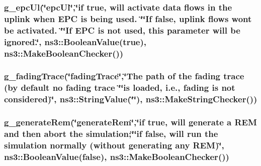 \subsubsection[{\texorpdfstring{g\+\_\+epc\+Ul}{g_epcUl}}]{ g\+\_\+epc\+Ul(\char`\"{}epc\+Ul\char`\"{},\char`\"{}{\bf if} true, will activate {\bf data} {\bf flows} in the uplink when E\+PC is being used. \char`\"{}\char`\"{}If {\bf false}, uplink {\bf flows} won\textquotesingle{}t be activated. \char`\"{}\char`\"{}If E\+PC is not used, this parameter will be ignored.\char`\"{}, ns3\+::\+Boolean\+Value(true), ns3\+::\+Make\+Boolean\+Checker())\hspace{0.3cm}{\ttfamily [static]}}\hypertarget{lena-dual-stripe_8cc_a50e951d7ab7ce99b1ba441fed4c676ac}{}\label{lena-dual-stripe_8cc_a50e951d7ab7ce99b1ba441fed4c676ac}
\subsubsection[{\texorpdfstring{g\+\_\+fading\+Trace}{g_fadingTrace}}]{ g\+\_\+fading\+Trace(\char`\"{}fading\+Trace\char`\"{},\char`\"{}The path of the fading trace (by default no fading trace \char`\"{}\char`\"{}is loaded, i.\+e., fading is not considered)\char`\"{}, ns3\+::\+String\+Value(\char`\"{}\char`\"{}), ns3\+::\+Make\+String\+Checker())\hspace{0.3cm}{\ttfamily [static]}}\hypertarget{lena-dual-stripe_8cc_a0abfba51e5ef4f0d9ccdb8da37781fca}{}\label{lena-dual-stripe_8cc_a0abfba51e5ef4f0d9ccdb8da37781fca}
\subsubsection[{\texorpdfstring{g\+\_\+generate\+Rem}{g_generateRem}}]{ g\+\_\+generate\+Rem(\char`\"{}generate\+Rem\char`\"{},\char`\"{}{\bf if} true, will generate a R\+EM and then abort the simulation;\char`\"{}\char`\"{}{\bf if} {\bf false}, will {\bf run} the simulation normally (without generating any R\+EM)\char`\"{}, ns3\+::\+Boolean\+Value({\bf false}), ns3\+::\+Make\+Boolean\+Checker())\hspace{0.3cm}{\ttfamily [static]}}\hypertarget{lena-dual-stripe_8cc_adba21d6e97a6ffcddb4647699de367eb}{}\label{lena-dual-stripe_8cc_adba21d6e97a6ffcddb4647699de367eb}
